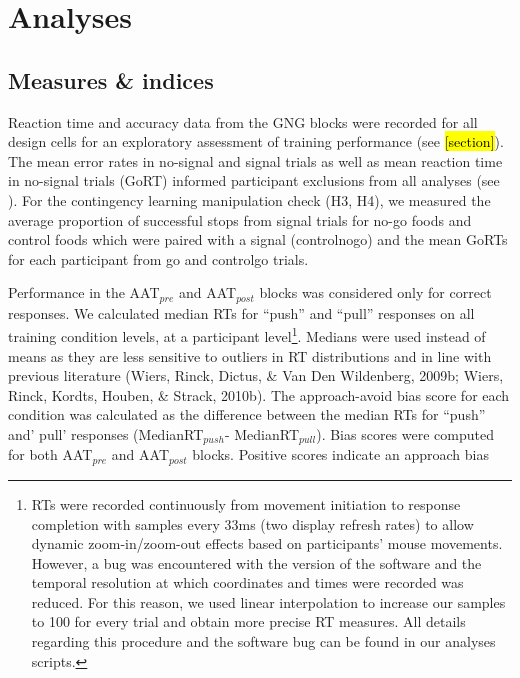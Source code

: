 \documentclass[man,floatsintext]{apa6}
\let\rmarkdownfootnote\footnote%
\def\footnote{\protect\rmarkdownfootnote}
\begin{document}
\section{Analyses}\label{analyses}

\subsection{Measures \& indices}\label{measures-indices}

\par

Reaction time and accuracy data from the GNG blocks were recorded for
all design cells for an exploratory assessment of training performance
(see \hl{[section]}). The mean error rates in no-signal and signal
trials as well as mean reaction time in no-signal trials (GoRT) informed
participant exclusions from all analyses (see
\textit{}). For the contingency learning
manipulation check (H3, H4), we measured the average proportion of
successful stops from signal trials for no-go foods and control foods
which were paired with a signal (controlnogo) and the mean GoRTs for
each participant from go and controlgo trials. \par
Performance in the AAT\(_{pre}\) and AAT\(_{post}\) blocks was
considered only for correct responses. We calculated median RTs for
\enquote{push} and \enquote{pull} responses on all training condition
levels, at a participant
level\footnote{RTs were recorded continuously from movement initiation to response completion with samples every 33ms (two display refresh rates) to allow dynamic zoom-in/zoom-out effects based on participants' mouse movements. However, a bug was encountered with the version of the software and the temporal resolution at which coordinates and times were recorded was reduced. For this reason, we used linear interpolation to increase our samples to 100 for every trial and obtain more precise RT measures. All details regarding this procedure and the software bug can be found in our analyses scripts.}.
Medians were used instead of means as they are less sensitive to
outliers in RT distributions and in line with previous literature
(Wiers, Rinck, Dictus, \& Van Den Wildenberg, 2009b; Wiers, Rinck,
Kordts, Houben, \& Strack, 2010b). The approach-avoid bias score for
each condition was calculated as the difference between the median RTs
for \enquote{push} and' pull' responses (MedianRT\(_{push}\)-
MedianRT\(_{pull}\)). Bias scores were computed for both AAT\(_{pre}\)
and AAT\(_{post}\) blocks. Positive scores indicate an approach bias
\end{document}
